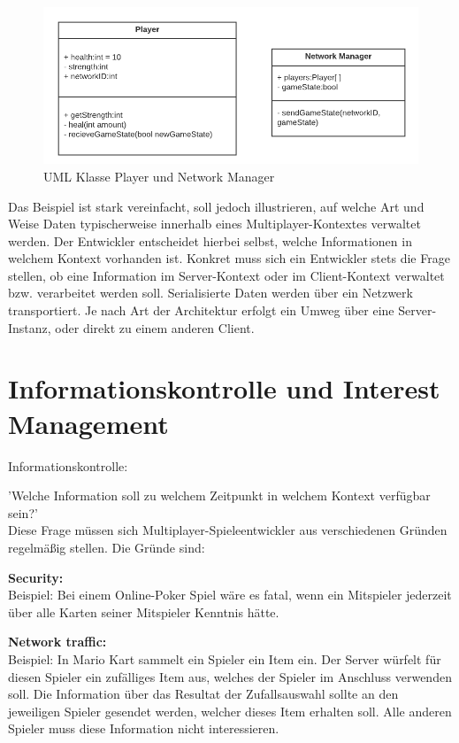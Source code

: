 \begin{figure}[H]
	\centering
	\includegraphics[width=130mm]{images/UML_class_Player_NM.png}
	\caption[UML Klassen]{UML Klasse Player und Network Manager}
	\label{pic:UML_class_Player_NM}
\end{figure}

Das Beispiel ist stark vereinfacht, soll jedoch illustrieren, auf welche Art und Weise Daten typischerweise innerhalb eines Multiplayer-Kontextes verwaltet werden. Der Entwickler entscheidet hierbei selbst, welche Informationen in welchem Kontext vorhanden ist. Konkret muss sich ein Entwickler stets die Frage stellen, ob eine Information im Server-Kontext oder im Client-Kontext verwaltet bzw. verarbeitet werden soll. Serialisierte Daten werden über ein Netzwerk transportiert. Je nach Art der Architektur erfolgt ein Umweg über eine Server-Instanz, oder direkt zu einem anderen Client. \cite{Smed.2002c}

\section{Informationskontrolle und Interest Management}

\textsf{\Large Informationskontrolle:}

'Welche Information soll zu welchem Zeitpunkt in welchem Kontext verfügbar sein?' \\
Diese Frage müssen sich Multiplayer-Spieleentwickler aus verschiedenen Gründen regelmäßig stellen. Die Gründe sind:

\textbf{Security:} \\
Beispiel: Bei einem Online-Poker Spiel wäre es fatal, wenn ein Mitspieler jederzeit über alle Karten seiner Mitspieler Kenntnis hätte. 

\textbf{Network traffic:} \\
Beispiel: In Mario Kart sammelt ein Spieler ein Item ein. Der Server würfelt für diesen Spieler ein zufälliges Item aus, welches der Spieler im Anschluss verwenden soll. Die Information über das Resultat der Zufallsauswahl sollte an den jeweiligen Spieler gesendet werden, welcher dieses Item erhalten soll. Alle anderen Spieler muss diese Information nicht interessieren.
 
